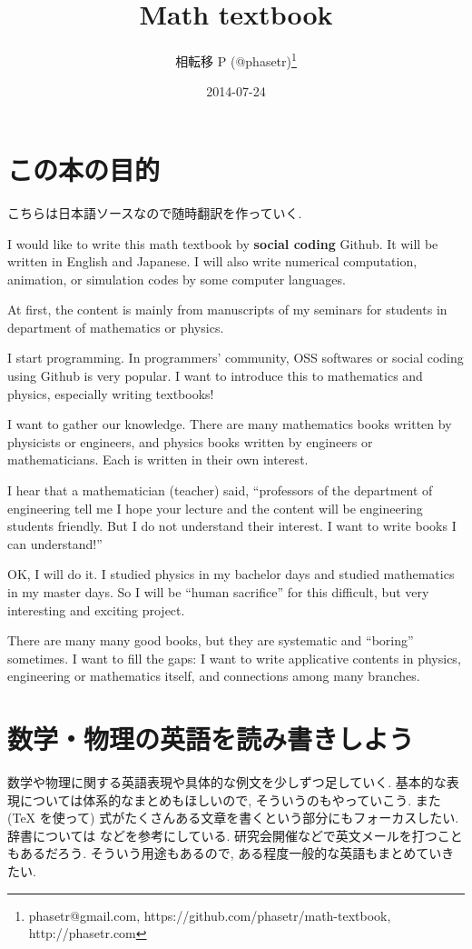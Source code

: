 \documentclass[openany, a4paper, oneside]{jsbook}
\title{Math textbook}
\author{相転移 P (@phasetr)\thanks{phasetr@gmail.com, https://github.com/phasetr/math-textbook, http://phasetr.com}}
\date{2014-07-24}
\theoremstyle{break}
\theoremstyle{breakdefn}
\begin{document}
\maketitle

\setcounter{tocdepth}{10}
\tableofcontents
\vspace*{1cm}

\part{この本の目的}


こちらは日本語ソースなので随時翻訳を作っていく.

I would like to write this math textbook by \textbf{social coding} Github.
It will be written in English and Japanese.
I will also write numerical computation, animation,
or simulation codes by some computer languages.

At first, the content is mainly from manuscripts
of my seminars for students in department of mathematics or physics.

I start programming.
In programmers' community, OSS softwares or social coding using Github
is very popular.
I want to introduce this to mathematics and physics,
especially writing textbooks!

I want to gather our knowledge.
There are many mathematics books written by physicists or engineers,
and physics books written by engineers or mathematicians.
Each is written in their own interest.

I hear that a mathematician (teacher) said,
``professors of the department of engineering tell me
I hope your lecture and the content will be engineering students friendly.
But I do not understand their interest.
I want to write books I can understand!''

OK, I will do it.
I studied physics in my bachelor days and studied mathematics
in my master days.
So I will be ``human sacrifice'' for this difficult, but very
interesting and exciting project.

There are many many good books,
but they are systematic and ``boring'' sometimes.
I want to fill the gaps:
I want to write applicative contents in physics, engineering or mathematics itself,
and connections among many branches.
\part{数学・物理の英語を読み書きしよう}


数学や物理に関する英語表現や具体的な例文を少しずつ足していく.
基本的な表現については体系的なまとめもほしいので, そういうのもやっていこう.
また (\TeX{} を使って) 式がたくさんある文章を書くという部分にもフォーカスしたい.
辞書については \cite{YusakuKomatsu1} などを参考にしている.
研究会開催などで英文メールを打つこともあるだろう.
そういう用途もあるので, ある程度一般的な英語もまとめていきたい.
\end{document}
